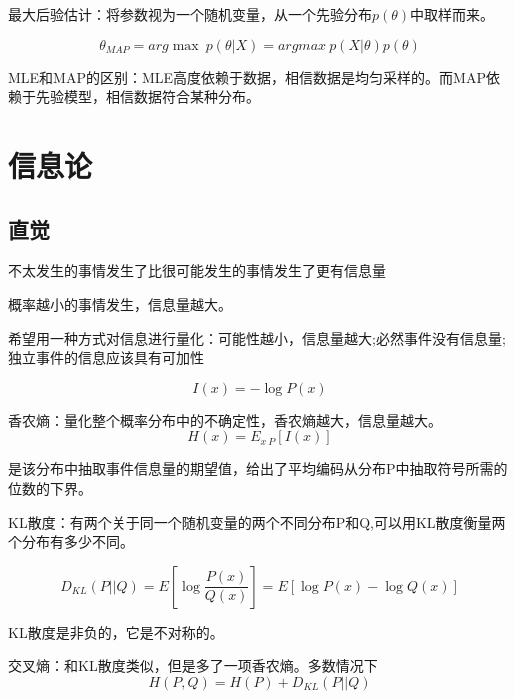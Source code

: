 \documentclass[UTF8]{ctexart}
\begin{document}
最大后验估计：将参数视为一个随机变量，从一个先验分布$p(\theta)$中取样而来。

$$\theta_{MAP}=arg\max\ p(\theta|X)=argmax\ p(X|\theta)p(\theta)$$

MLE和MAP的区别：MLE高度依赖于数据，相信数据是均匀采样的。而MAP依赖于先验模型，相信数据符合某种分布。

\section{信息论}
\subsection{直觉}不太发生的事情发生了比很可能发生的事情发生了更有信息量

概率越小的事情发生，信息量越大。

希望用一种方式对信息进行量化：可能性越小，信息量越大;必然事件没有信息量;独立事件的信息应该具有可加性

$$I(x)=-\log P(x)$$

香农熵：量化整个概率分布中的不确定性，香农熵越大，信息量越大。
$$H(x)=E_{x~P}[I(x)]$$

是该分布中抽取事件信息量的期望值，给出了平均编码从分布P中抽取符号所需的位数的下界。

KL散度：有两个关于同一个随机变量的两个不同分布P和Q,可以用KL散度衡量两个分布有多少不同。

$$D_{KL}(P||Q)=E[\log \frac{P(x)}{Q(x)}]=E[\log P(x) - \log Q(x)]$$

KL散度是非负的，它是不对称的。

交叉熵：和KL散度类似，但是多了一项香农熵。多数情况下
$$H(P,Q)=H(P) + D_{KL}(P||Q)$$
\end{document}
